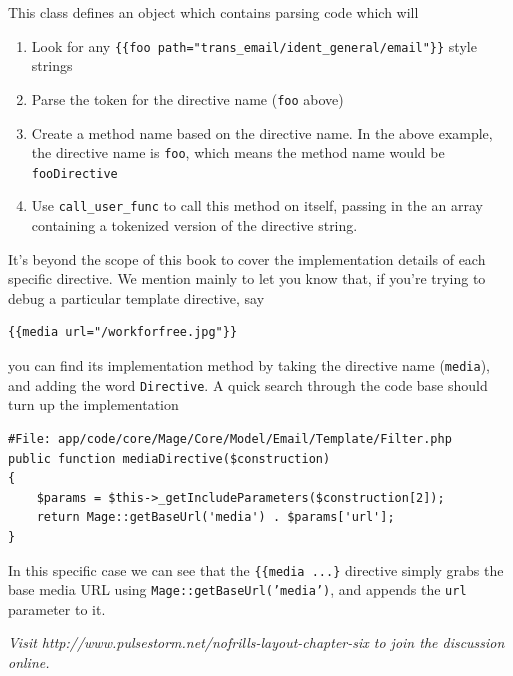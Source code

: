 \documentclass[oneside]{book}
\begin{document}
This class defines an object which contains parsing code which will

\begin{enumerate}
\item Look for any \footnotesize\texttt{\{\{foo path="trans\_email/ident\_general/email"\}\}} \normalsize  style strings
\item Parse the token for the directive name (\footnotesize\texttt{foo} \normalsize  above)
\item Create a method name based on the directive name.  In the above example, the directive name is \footnotesize\texttt{foo}\normalsize, which means the method name would be \footnotesize\texttt{fooDirective} \normalsize
\item Use \footnotesize\texttt{call\_user\_func} \normalsize  to call this method on itself, passing in the an array containing a tokenized version of the directive string.
\end{enumerate}


It's beyond the scope of this book to cover the implementation details of each specific directive.  We mention mainly to let you know that, if you're trying to debug a particular template directive, say

\begin{lstlisting}
{{media url="/workforfree.jpg"}}

\end{lstlisting}


you can find its implementation method by taking the directive name (\footnotesize\texttt{media}\normalsize), and adding the word \footnotesize\texttt{Directive}\normalsize.  A quick search through the code base should turn up the implementation

\begin{lstlisting}
#File: app/code/core/Mage/Core/Model/Email/Template/Filter.php
public function mediaDirective($construction)
{
    $params = $this->_getIncludeParameters($construction[2]);
    return Mage::getBaseUrl('media') . $params['url'];
}

\end{lstlisting}


In this specific case we can see that the \footnotesize\texttt{\{\{media ...\}} \normalsize  directive simply grabs the base media URL using \footnotesize\texttt{Mage::getBaseUrl('media')}\normalsize, and appends the \footnotesize\texttt{url} \normalsize  parameter to it.

\emph{Visit http://www.pulsestorm.net/nofrills-layout-chapter-six to join the discussion online.}
\end{document}
